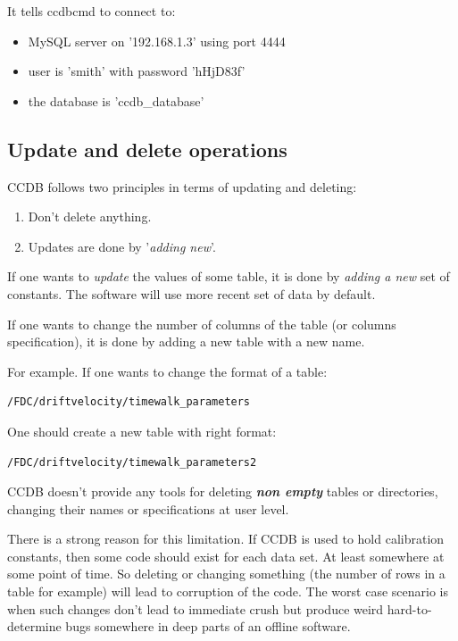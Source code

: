\documentclass{article}
\begin{document}
It tells ccdbcmd to connect to:
\begin{itemize}
  \item MySQL server  on '192.168.1.3' using port 4444
  \item user is 'smith' with password 'hHjD83f'
  \item the database is 'ccdb\_database'
\end{itemize}


\subsection{Update and delete operations}

CCDB follows two principles in terms of updating and deleting:
\begin{enumerate}
\item Don't delete anything.
\item Updates are done by '\textit{adding new}'.
\end{enumerate}

If one wants to \textit{update} the values of some table, it is done by 
\textit{adding a new} set of constants. The software will use more recent set 
of data by default. 

If one wants to change the number of columns of the table (or columns 
specification), it is done by adding a new table with a new name. 

For example. If one wants to change the format of a table:
\begin{verbatim}
/FDC/driftvelocity/timewalk_parameters
\end{verbatim}
One should create a new table with right format:
\begin{verbatim}
/FDC/driftvelocity/timewalk_parameters2
\end{verbatim}

CCDB doesn't provide any tools for deleting \textbf{\textit{non empty}} tables 
or directories, changing their names or specifications at user level. 

There is a strong reason for this limitation. 
If CCDB is used to hold calibration constants, then some code should exist for 
each data set. At least somewhere at some point of time. So deleting  
or changing something (the number of rows in a table for example) will lead to 
corruption of the code. The worst case scenario is when such changes don't
lead to immediate crush but produce weird hard-to-determine bugs somewhere in 
deep parts of an offline software.
\end{document}
